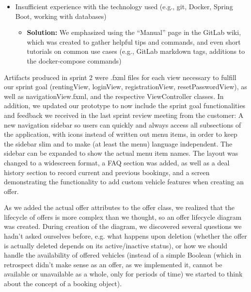 \begin{itemize}
\begin{itemize}
    \end{itemize}
    \item Insufficient experience with the technology used (e.g., git, Docker, Spring Boot, working with databases)
    \begin{itemize}
        \item \textbf{Solution:} We emphasized using the “Manual” page in the GitLab wiki, which was created to gather helpful tips and commands, and even short tutorials on common use cases (e.g., GitLab markdown tags, additions to the docker-compose commands)
    \end{itemize}
\end{itemize}

Artifacts produced in sprint 2 were .fxml files for each view necessary to fulfill our sprint goal (rentingView, loginView, registrationView, resetPasswordView), as well as navigationView.fxml, and the respective ViewController classes. In addition, we updated our prototype to now include the sprint goal functionalities and feedback we received in the last sprint review meeting from the customer: A new navigation sidebar so users can quickly and always access all subsections of the application, with icons instead of written out menu items, in order to keep the sidebar slim and to make (at least the menu) language independent. The sidebar can be expanded to show the actual menu item names. The layout was changed to a widescreen format, a FAQ section was added, as well as a deal history section to record current and previous bookings, and a screen demonstrating the functionality to add custom vehicle features when creating an offer.

As we added the actual offer attributes to the offer class, we realized that the lifecycle of offers is more complex than we thought, so an offer lifecycle diagram was created. During creation of the diagram, we discovered several questions we hadn’t asked ourselves before, e.g. what happens upon deletion (whether the offer is actually deleted depends on its active/inactive status), or how we should handle the availability of offered vehicles (instead of a simple Boolean (which in retrospect didn’t make sense as an offer, as we implemented it, cannot be available or unavailable as a whole, only for periods of time) we started to think about the concept of a booking object).

